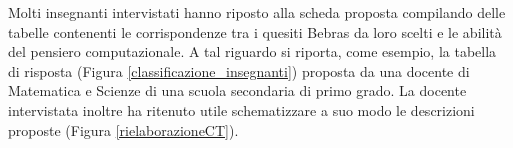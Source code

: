 \documentclass[12pt]{report}
\begin{document}

\bigskip
Molti insegnanti intervistati hanno riposto alla scheda proposta compilando delle tabelle contenenti le corrispondenze tra i quesiti Bebras da loro scelti e le abilità del pensiero computazionale. A tal riguardo si riporta, come esempio, la tabella di risposta (Figura \ref{classificazione_insegnanti}) proposta da una docente di Matematica e Scienze di una scuola secondaria di primo grado. La docente intervistata inoltre ha ritenuto utile schematizzare a suo modo le descrizioni proposte (Figura \ref{rielaborazioneCT}).
\end{document}
